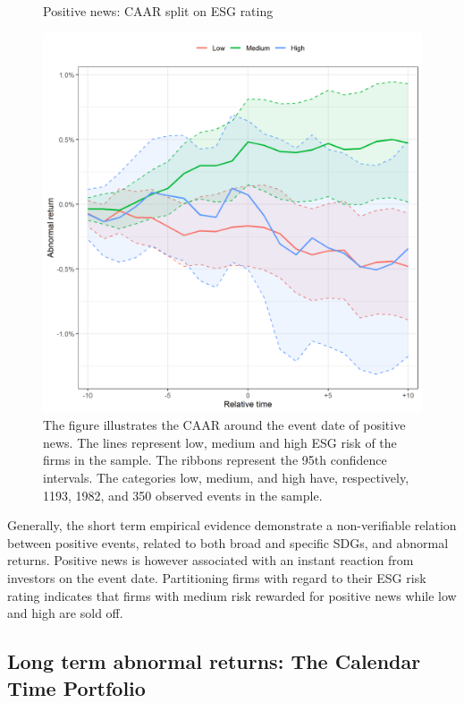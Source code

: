 \begin{figure} [H]
    \centering
    \caption{Positive news: CAAR split on ESG rating}
    \includegraphics[scale=0.6]{Projekt/1.Figures analysis/ST_positive_ESG.png}
     \caption*{\footnotesize The figure illustrates the CAAR around the event date of positive news. The lines represent low, medium and high ESG risk of the firms in the sample. The ribbons represent the 95th confidence intervals. The categories low, medium, and high have, respectively, 1193, 1982, and 350 observed events in the sample.  }
    \label{fig:ST_pos_ESG}
\end{figure} 

Generally, the short term empirical evidence demonstrate a non-verifiable relation between positive events, related to both broad and specific SDGs, and abnormal returns. Positive news is however associated with an instant reaction from investors on the event date. Partitioning firms with regard to their ESG risk rating indicates that firms with medium risk rewarded for positive news while low and high are sold off.     



\subsection{Long term abnormal returns: The Calendar Time Portfolio} \label{sec: long_term_portfolio}

